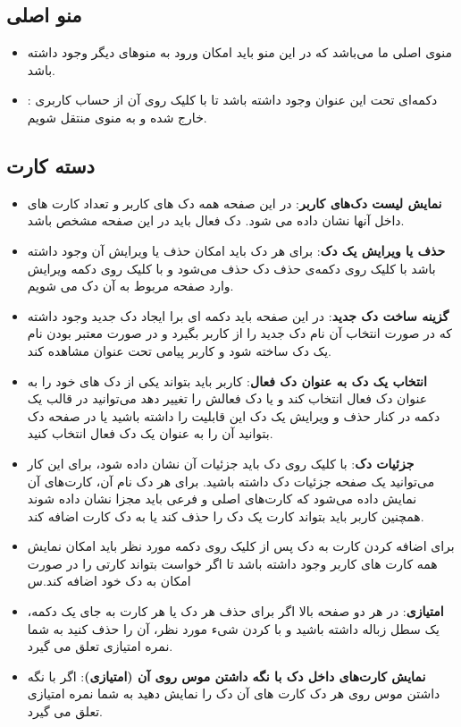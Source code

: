 \documentclass[]{article}
\begin{document}
\subsection*{{\titr منو اصلی}}

\begin{itemize}
    \item منوی اصلی ما می‌باشد که در این منو باید امکان ورود به منو‌های دیگر وجود داشته باشد.
    \item {}: دکمه‌ای تحت این عنوان وجود داشته باشد تا با کلیک روی آن از حساب کاربری خارج شده و به منوی  منتقل شویم.
\end{itemize}

\subsection*{{\titr دسته کارت}}
\begin{itemize}
    \item \textbf{نمایش لیست دک‌های کاربر}: در این صفحه همه دک های کاربر و تعداد کارت های داخل آنها نشان داده می شود. دک فعال باید در این صفحه مشخص باشد.
    \item \textbf{حذف یا ویرایش یک دک}: برای هر دک باید امکان حذف یا ویرایش آن وجود داشته باشد با کلیک روی دکمه‌ی حذف دک حذف می‌شود و با کلیک روی دکمه ویرایش وارد صفحه مربوط به آن دک می شویم.
    \item \textbf{گزینه ساخت دک جدید}: در این صفحه باید دکمه ای برا ایجاد دک جدید وجود داشته که در صورت انتخاب آن نام دک جدید را از کاربر بگیرد و در صورت معتبر بودن نام  یک دک ساخته شود و کاربر پیامی تحت عنوان  مشاهده کند.
    \item \textbf{انتخاب یک دک به عنوان دک فعال}: کاربر باید بتواند یکی از دک های خود را به عنوان دک فعال انتخاب کند و یا دک فعالش را تغییر دهد می‌توانید در قالب یک دکمه در کنار حذف و ویرایش یک دک این قابلیت را داشته باشید یا در صفحه دک بتوانید آن را به عنوان یک دک فعال انتخاب کنید.
    \item \textbf{جزئیات دک}: با کلیک روی دک باید جزئیات آن نشان داده شود، برای این کار می‌توانید یک صفحه جزئیات دک داشته باشید. برای هر دک نام آن، کارت‌های آن نمایش داده می‌شود که کارت‌های اصلی و فرعی باید مجزا نشان داده شوند همچنین کاربر باید بتواند کارت یک دک را حذف کند یا به دک کارت اضافه کند.
    \item برای اضافه کردن کارت به دک پس از کلیک روی دکمه مورد نظر باید امکان نمایش همه کارت های کاربر وجود داشته باشد تا اگر خواست بتواند کارتی را در صورت امکان به دک خود اضافه کند.س
    \item \textbf{امتیازی}: در هر دو صفحه بالا اگر برای حذف هر دک یا هر کارت به جای یک دکمه، یک  سطل زباله داشته باشید و با  کردن شیء مورد  نظر، آن را حذف کنید به شما نمره امتیازی تعلق می گیرد.
    \item \textbf{نمایش کارت‌های داخل دک با نگه داشتن موس روی آن (امتیازی)}:
    اگر با نگه داشتن موس روی هر دک کارت های آن دک را نمایش دهید به شما نمره امتیازی تعلق می گیرد.    
\end{itemize}
\end{document}
